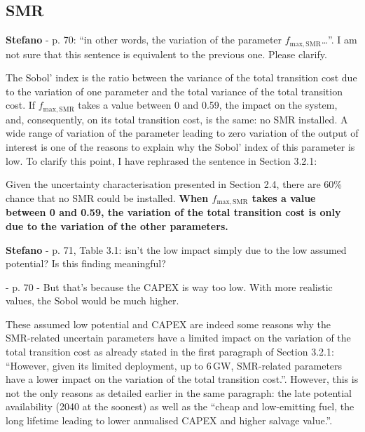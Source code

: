 \documentclass[12pt,a4paper]{article}
\begin{document}
\subsection{SMR}

\begin{mdframed}[style=comment] %
{\color{orange} \textbf{Stefano}} - p. 70: ``in other words, the variation of the parameter $f_{\mathrm{max,SMR}}$…''. I am not sure that this sentence is equivalent to the previous one. Please clarify.
\end{mdframed}

\noindent The Sobol' index is the ratio between the variance of the total transition cost due to the variation of one parameter and the total variance of the total transition cost. If $f_{\mathrm{max,SMR}}$ takes a value between 0 and 0.59, the impact on the system, and, consequently, on its total transition cost, is the same: no SMR installed. A wide range of variation of the parameter leading to zero variation of the output of interest is one of the reasons to explain why the Sobol' index of this parameter is low. To clarify this point, I have rephrased the sentence {\color{blue}in Section 3.2.1}:

\begin{mdframed}[style=manuscript] %
Given the uncertainty characterisation presented in Section 2.4, there are 60\% chance that no SMR could be installed. \textbf{When $f_{\mathrm{max,SMR}}$ takes a value between 0 and 0.59, the variation of the total transition cost is only due to the variation of the other parameters. }
\end{mdframed}

\begin{mdframed}[style=comment] %
{\color{orange} \textbf{Stefano}} - p. 71, Table 3.1: isn’t the low impact simply due to the low assumed potential? Is this finding meaningful?

 - p. 70 - But that's because the CAPEX is way too low. With more realistic values, the Sobol would be much higher.
\end{mdframed}

\noindent These assumed low potential and CAPEX are indeed some reasons why the SMR-related uncertain parameters have a limited impact on the variation of the total transition cost as already stated in the first paragraph of Section 3.2.1: ``However, given its limited deployment, up to 6\,GW, SMR-related parameters have a lower impact on the variation of the total transition cost.''. However, this is not the only reasons as detailed earlier in the same paragraph: the late potential availability (2040 at the soonest) as well as the ``cheap and low-emitting fuel, the long lifetime leading to lower annualised CAPEX and higher salvage value.''. 
\end{document}
